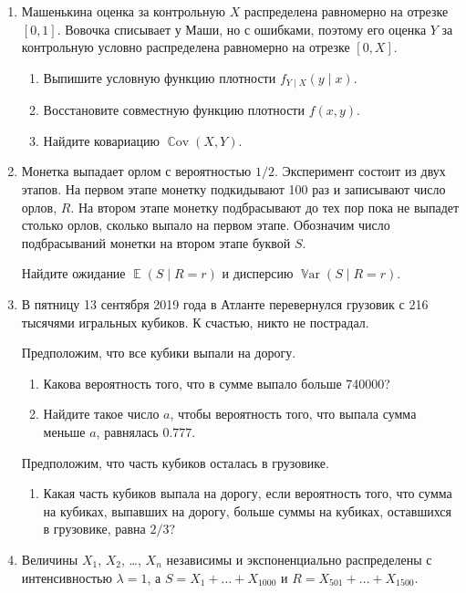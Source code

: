 \documentclass[12pt]{article}
\DeclareMathOperator{\Cov}{\mathbb{C}ov}
\DeclareMathOperator{\Var}{\mathbb{V}ar}
\DeclareMathOperator{\E}{\mathbb{E}}
\begin{document}
\begin{enumerate}
    \item Машенькина оценка за контрольную $X$ распределена равномерно на отрезке $[0, 1]$. 
    Вовочка списывает у Маши, но с ошибками, поэтому его оценка $Y$ за контрольную условно распределена равномерно на отрезке
    $[0, X]$. 

    \begin{enumerate}
        \item Выпишите условную функцию плотности $f_{Y\mid X}(y \mid x)$.
        \item Восстановите совместную функцию плотности $f(x, y)$.
        \item Найдите ковариацию $\Cov(X, Y)$.
    \end{enumerate}

    \item  Монетка выпадает орлом с вероятностью $1/2$. 
    Эксперимент состоит из двух этапов. 
    На первом этапе монетку подкидывают 100 раз и записывают число орлов, $R$. 
    На втором этапе монетку подбрасывают до тех пор пока не выпадет столько орлов, сколько выпало на первом этапе. 
    Обозначим число подбрасываний монетки на втором этапе буквой $S$. 
   
    Найдите ожидание $\E(S \mid R = r)$ и дисперсию $\Var(S \mid R = r)$.

    \item В пятницу 13 сентября 2019 года в Атланте перевернулся грузовик с 216 тысячями игральных кубиков. 
    К счастью, никто не пострадал. 

    Предположим, что все кубики выпали на дорогу. 
    \begin{enumerate}
      \item Какова вероятность того, что в сумме выпало больше 740000?
      \item Найдите такое число $a$, чтобы вероятность того, что выпала сумма меньше $a$, равнялась $0.777$.
    \end{enumerate}

    Предположим, что часть кубиков осталась в грузовике.
    \begin{enumerate}[resume]
      \item Какая часть кубиков выпала на дорогу, если 
      вероятность того, что сумма на кубиках, выпавших на дорогу,
      больше суммы на кубиках, оставшихся в грузовике, равна $2/3$?
    \end{enumerate}
  
    \item Величины $X_1$, $X_2$, \dots, $X_n$ независимы и экспоненциально распределены с интенсивностью $\lambda = 1$,
    а $S = X_1 + \dots + X_{1000}$ и $R = X_{501} + \dots + X_{1500}$.


\end{enumerate}
\end{document}
